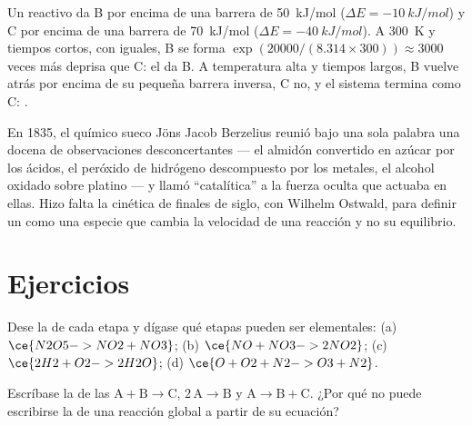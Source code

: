 \begin{example}\label{ex:b1:elementary-steps:control}
Un reactivo da B por encima de una barrera de \qty{50}{kJ/mol}
($\Delta E =
\qty{-10}{kJ/mol}$) y C por encima de una barrera de \qty{70}{kJ/mol}
($\Delta E =
\qty{-40}{kJ/mol}$). A \qty{300}{K} y tiempos cortos, con  iguales, B se forma $\exp(20000/(8.314 \times 300)) \approx
3000$ veces más deprisa que C: el  da B. A temperatura
alta y tiempos largos, B vuelve atrás por encima de su pequeña barrera
inversa, C no, y el sistema termina como C: .
\end{example}

\begin{history}[La catálisis, 1835]
En 1835, el químico sueco Jöns Jacob Berzelius reunió bajo una sola
palabra una docena de observaciones desconcertantes --- el almidón
convertido en azúcar por los ácidos, el peróxido de hidrógeno descompuesto
por los metales, el alcohol oxidado sobre platino --- y llamó
``catalítica'' a la fuerza oculta que actuaba en ellas. Hizo falta la
cinética de finales de siglo, con Wilhelm Ostwald, para definir un
 como una especie que cambia la velocidad de una reacción y no
su equilibrio.
\end{history}

\section{Ejercicios}

\begin{exercise}[$\star$]\label{exo:b1:elementary-steps:1}
Dese la  de cada etapa y dígase qué etapas pueden ser
elementales:
(a) $\ce{N2O5 -> NO2 + NO3}$; (b) $\ce{NO + NO3 -> 2NO2}$;
(c) $\ce{2H2 + O2 -> 2H2O}$; (d) $\ce{O + O2 + N2 -> O3 + N2}$.
\end{exercise}

\begin{exercise}[$\star$]\label{exo:b1:elementary-steps:2}
Escríbase la  de las  $\mathrm{A} + \mathrm{B} \to
\mathrm{C}$, $2\,\mathrm{A} \to \mathrm{B}$ y $\mathrm{A} \to \mathrm{B} +
\mathrm{C}$. ¿Por qué no puede escribirse la  de una
reacción global a partir de su ecuación?
\end{exercise}

